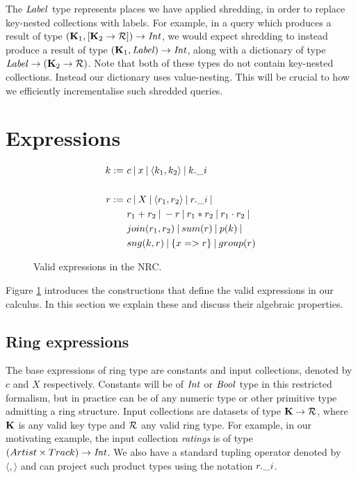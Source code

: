 {{{The $\textrm{\textit{Label}}$ type represents places we have applied shredding, in order to replace key-nested collections with labels. For example, in a query which produces a result of type  $(\mathbf{K}_1,[\mathbf{K}_2 \rightarrow \mathcal{R}]) \rightarrow \textrm{\textit{Int}}$, we would expect shredding to instead produce a result of type 
$(\mathbf{K}_1,\textrm{\textit{Label}}) \rightarrow \textrm{\textit{Int}}$, along with a dictionary of type $\textrm{\textit{Label}} \rightarrow (\mathbf{K}_2 \rightarrow \mathcal{R})$. Note that both of these types do not contain key-nested collections. Instead our dictionary uses value-nesting. This will be crucial to how we efficiently incrementalise such shredded queries.

}

\section{Expressions} \label{nrcexprsection}

\begin{figure}
\begin{equation*}
\begin{split}
k := \ & c \: | \: x \: | \: \langle k_1, k_2 \rangle \: | \: k.\_i \\ \\
r := \ & c \: | \: X \: | \: \langle r_1, r_2 \rangle \: | \: r.\_i \: | \: \\
& r_1 + r_2 \: | \: -r \: | \: r_1 \ast r_2 \: | \: r_1 \cdot r_2 \: | \: \\
& join(r_1,r_2) \: | \: sum(r) \: | \: p(k) \: | \: \\
& sng(k,r) \: | \: \{ x => r \} \: | \: group(r)
\end{split}
\end{equation*}
\caption{Valid expressions in the NRC.}
\label{nrcexprs}
\end{figure}

Figure \ref{nrcexprs} introduces the constructions that define the valid expressions in our calculus. In this section we explain these and discuss their algebraic properties.

\subsection{Ring expressions} {
The base expressions of ring type are constants and input collections, denoted by $c$ and $X$ respectively. Constants will be of $\textrm{\textit{Int}}$ or $\textrm{\textit{Bool}}$ type in this restricted formalism, but in practice can be of any numeric type or other primitive type admitting a ring structure. Input collections are datasets of type $\mathbf{K} \rightarrow \mathcal{R}$, where $\mathbf{K}$ is any valid key type and $\mathcal{R}$ any valid ring type. For example, in our motivating example, the input collection \textit{ratings} is of type $(Artist \times Track) \rightarrow \textrm{\textit{Int}}$. We also have a standard tupling operator denoted by $\langle , \rangle$ and can project such product types using the notation $r.\_i$.

}}}
